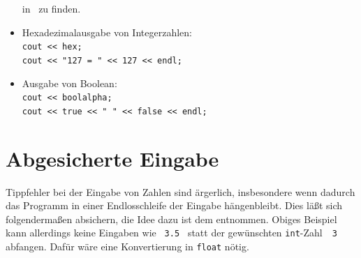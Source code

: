 \begin{itemize}
	in~\cite[\S1.4.6.2, pp.679]{Stroustrup:2000:CPP}
	zu finden.
%
 \item Hexadezimalausgabe von Integerzahlen: \\
	\verb|cout << hex;|\\
	\verb|cout << "127 = " << 127 << endl;|
%
\item Ausgabe von Boolean:\\
	\verb|cout << boolalpha;|\\
	\verb|cout << true << " " << false << endl;|
%
\end{itemize}
%
%
%
\section{Abgesicherte Eingabe}
\label{p:8.5}
Tippfehler bei der Eingabe von Zahlen sind ärgerlich, insbesondere wenn dadurch das Programm in einer Endlosschleife der Eingabe hängenbleibt.
Dies läßt sich folgendermaßen absichern, die Idee dazu ist dem  entnommen.
%
%
Obiges Beispiel kann allerdings keine Eingaben wie \verb| 3.5 |
statt der gewünschten \texttt{int}-Zahl~\verb| 3 | abfangen. 
Dafür wäre eine Konvertierung in \texttt{float} nötig.









